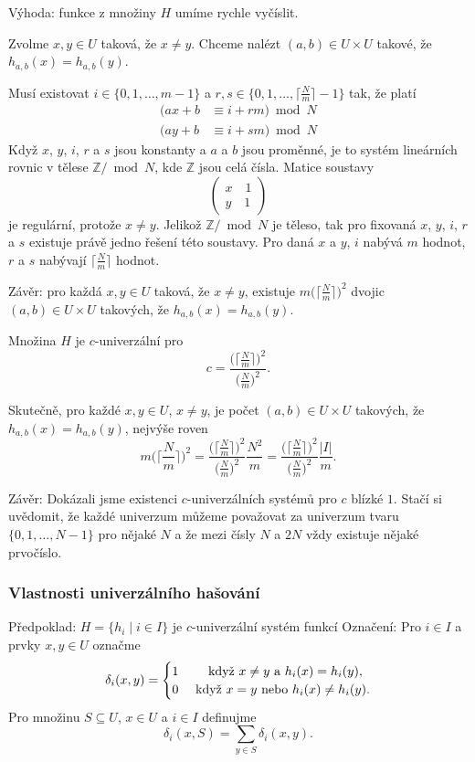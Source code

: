\documentclass[a4paper,12pt]{article}
\begin{document}
Výhoda: funkce z množiny $H$ umíme rychle 
vyčíslit.

Zvolme $x,y\in U$ taková, že $x\ne y$. Chceme nalézt 
$(a,b)\in U\times U$ takové, že $h_{a,b}(x)=h_{a,b}(y)$. 

Musí existovat $i\in \{0,1,\dots,m-1\}$ a 
$r,s\in \{0,1,\dots,\lceil\frac Nm\rceil -1\}$ tak, že platí
\begin{align*}(ax+b&\equiv i+rm)\bmod N\\
(ay+b&\equiv i+sm)\bmod N\end{align*}
Když $x$, $y$, $i$, $r$ a $s$ jsou konstanty a $a$ a $b$ jsou 
proměnné, je to systém lineárních rovnic v tělese 
$\mathbb Z/\bmod N$, kde $\mathbb Z$ jsou celá čísla. Matice soustavy  
$$\begin{pmatrix} x\quad 1\\
y\quad 1\end{pmatrix} $$
je regulární, protože $x\ne y$. Jelikož $\mathbb Z/\bmod N$ je těleso, tak 
 pro fixovaná $x$, $y$, $i$, $r$ a $s$ existuje právě jedno řešení této soustavy.
Pro daná $x$ a $y$, $i$ nabývá $m$ hodnot, $r$ a $s$ nabývají 
$\lceil\frac Nm\rceil$ hodnot. 

Závěr: pro každá $x,y\in U$ taková, že 
$x\ne y$, existuje $m\big(\lceil\frac Nm\rceil\big)^2$ dvojic $(a
,b)\in U\times U$ takových, že 
$h_{a,b}(x)=h_{a,b}(y)$.

\begin{veta}Množina $H$ je $c$-univerzální pro 
$$c=\frac {\big(\lceil\frac Nm\rceil\big)^2}{\big(\frac Nm\big)^2}
.$$
\end{veta}

Skutečně, pro každé $x,y\in U$, $x\ne y$, je počet 
$(a,b)\in U\times U$ takových, že $h_{a,b}(x)=h_{a,b}(y)$, nejvýše roven
$$m\big(\lceil\frac Nm\rceil\big)^2=\frac {\big(\lceil\frac Nm\rceil\big
)^2}{\big(\frac Nm\big)^2}\frac {N^2}m=\frac {\big(\lceil\frac Nm
\rceil\big)^2}{\big(\frac Nm\big)^2}\frac {|I|}m.$$

Závěr: Dokázali jsme existenci $c$-univerzálních 
systémů pro $c$ blízké $1$. Stačí si uvědomit, že  každé univerzum můžeme 
považovat za univerzum tvaru $\{0,1,\dots,N-1\}$ pro nějaké 
$N$ a že mezi čísly $N$ a $2N$ vždy existuje nějaké 
prvočíslo.

\subsubsection{Vlastnosti univerzálního hašování}

Předpoklad: $H=\{h_i\mid i\in I\}$ je $c$-univerzální systém funkcí\newline 
Označení: Pro $i\in I$ a prvky $x,y\in U$ 
označme 
$$\delta_i(x,y)=\begin{cases} 1&\quad\text{\rm\ když }x\ne y\text{\rm\ a }
h_i(x)=h_i(y),\\
0&\text{\rm\ když }x=y\text{\rm\ nebo }h_i(x)\ne h_i(y).\end{cases} $$
Pro množinu $S\subseteq U$, $x\in U$ a $i\in I$ definujme
$$\delta_i(x,S)=\sum_{y\in S}\delta_i(x,y).$$
\end{document}
